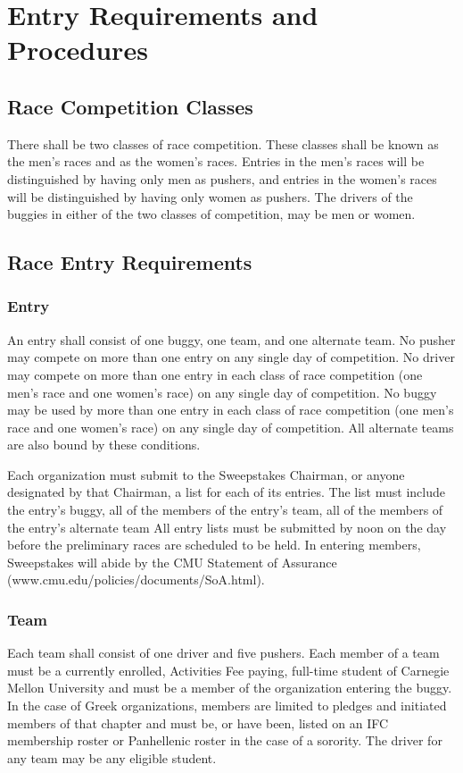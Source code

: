 \chapter{Entry Requirements and Procedures}

\section{Race Competition Classes}
There shall be two classes of race competition. These classes shall be known as the men's races and as the women's races. Entries in the men's races will be distinguished by having only men as pushers, and entries in the women's races will be distinguished by having only women as pushers. The drivers of the buggies in either of the two classes of competition, may be men or women.

\section{Race Entry Requirements}

\subsection{Entry}
An entry shall consist of one buggy, one team, and one alternate team. No pusher may compete on more than one entry on any single day of competition. No driver may compete on more than one entry in each class of race competition (one men's race and one women's race) on any single day of competition. No buggy may be used by more than one entry in each class of race competition (one men's race and one women's race) on any single day of competition. All alternate teams are also bound by these conditions.

Each organization must submit to the Sweepstakes Chairman, or anyone designated by that Chairman, a list for each of its entries. The list must include the entry's buggy, all of the members of the entry's team, all of the members of the entry's alternate team All entry lists must be submitted by noon on the day before the preliminary races are scheduled to be held.  In entering members, Sweepstakes will abide by the CMU Statement of Assurance (www.cmu.edu/policies/documents/SoA.html).

\subsection{Team}
Each team shall consist of one driver and five pushers. Each member of a team must be a currently enrolled, Activities Fee paying, full-time student of Carnegie Mellon University and must be a member of the organization entering the buggy. In the case of Greek organizations, members are limited to pledges and initiated members of that chapter and must be, or have been, listed on an IFC membership roster or Panhellenic roster in the case of a sorority. The driver for any team may be any eligible student.

